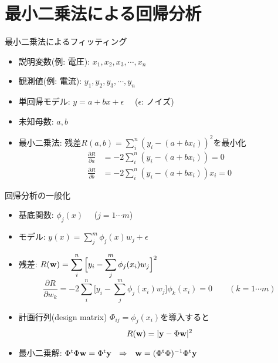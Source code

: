 \section{最小二乗法による回帰分析}

\begin{frame}[t,fragile]{最小二乗法によるフィッティング}
  \begin{itemize}
  \item 説明変数(例: 電圧): $x_1,x_2,x_3,\cdots,x_n$
  \item 観測値(例: 電流): $y_1,y_2,y_3,\cdots,y_n$
  \item 単回帰モデル: $y=a+bx+\epsilon$ \ \ ($\epsilon$: ノイズ)
  \item 未知母数: $a,b$
  \item 最小二乗法:
    残差$\displaystyle R(a,b) = \sum_i^n (y_i - (a+bx_i))^2$を最小化
    \[
    \begin{split}
      \frac{\partial R}{\partial a} &= - 2 \sum_i^n (y_i - (a+bx_i)) = 0 \\
      \frac{\partial R}{\partial b} &= - 2 \sum_i^n (y_i - (a+bx_i))x_i = 0
    \end{split}
    \]
  \end{itemize}
\end{frame}

\begin{frame}[t,fragile]{回帰分析の一般化}
  \begin{itemize}
  \item 基底関数: $\phi_j(x)$ \ \ ($j=1 \cdots m$)
  \item モデル: $\displaystyle y(x) = \sum_j^m \phi_j(x) w_j + \epsilon$
  \item 残差: $\displaystyle R({\bf w}) = \sum_i^n \Big[y_i - \sum_j^m \phi_j(x_i) w_j\Big]^2$
    \[
    \frac{\partial R}{\partial w_k} = -2 \sum_i^n \Big[ y_i - \sum_j^m \phi_j(x_i) w_j\Big] \phi_k(x_i) = 0 \qquad (k = 1\cdots m)
    \]
  \item 計画行列(design matrix) $\Phi_{ij} = \phi_j(x_i)$を導入すると
    \[
    R({\bf w}) = | {\bf y} - \Phi {\bf w} |^2
    \]
  \item 最小二乗解: $\Phi^{\rm t} \Phi {\bf w} = \Phi^{\rm t} {\bf y} \ \ \Rightarrow \ \
{\bf w} = (\Phi^{\rm t} \Phi)^{-1}\Phi^{\rm t} {\bf y}$
  \end{itemize}
\end{frame}

